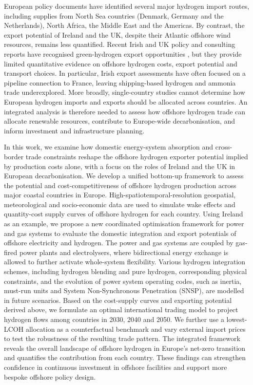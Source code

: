 \documentclass[pdflatex,lineno,sn-mathphys,Numbered]{sn-jnl}%
\begin{document}
European policy documents have identified several major hydrogen import routes,
including supplies from North Sea countries (Denmark, Germany and the Netherlands),
North Africa, the Middle East and the Americas. By contrast, the export potential
of Ireland and the UK, despite their Atlantic offshore wind resources, remains
less quantified. Recent Irish and UK policy and consulting reports have recognised
green-hydrogen export opportunities \cite{HydrogenImport, FutureFrameworkfor}, but
they provide limited quantitative evidence on offshore hydrogen costs, export
potential and transport choices. In particular, Irish export assessments have often
focused on a pipeline connection to France, leaving shipping-based hydrogen and
ammonia trade underexplored. More broadly, single-country studies cannot determine
how European hydrogen imports and exports should be allocated across countries.
An integrated analysis is therefore needed to assess how offshore hydrogen trade
can allocate renewable resources, contribute to Europe-wide decarbonisation, and
inform investment and infrastructure planning.

In this work, we examine how domestic energy-system absorption and cross-border trade constraints reshape the offshore hydrogen exporter potential implied by production costs alone, with a focus on the roles of Ireland and the UK in European decarbonisation.
We develop a unified bottom-up framework to assess the potential and cost-competitiveness of offshore hydrogen production across major coastal countries in Europe. High-spatiotemporal-resolution geospatial, meteorological and socio-economic data are used to simulate wake effects and quantity-cost supply curves of offshore hydrogen for each country.
Using Ireland as an example, we propose a new coordinated optimisation framework for power and gas systems to evaluate the domestic integration and export potentials of offshore electricity and hydrogen. The power and gas systems are coupled by gas-fired power plants and electrolysers, where bidirectional energy exchange is allowed to further activate whole-system flexibility. Various hydrogen integration schemes, including hydrogen blending and pure hydrogen, corresponding physical constraints, and the evolution of power system operating codes, such as inertia, must-run units and System Non-Synchronous Penetration (SNSP), are modelled in future scenarios.
Based on the cost-supply curves and exporting potential derived above, we formulate an optimal international trading model to project hydrogen flows among countries in 2030, 2040 and 2050. We further use a lowest-LCOH allocation as a counterfactual benchmark and vary external import prices to test the robustness of the resulting trade pattern. The integrated framework reveals the overall landscape of offshore hydrogen in Europe's net-zero transition and quantifies the contribution from each country. These findings can strengthen confidence in continuous investment in offshore facilities and support more bespoke offshore policy design.
\end{document}
